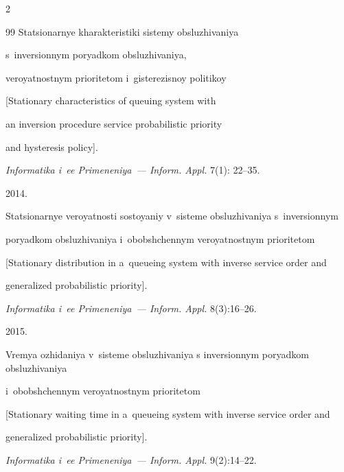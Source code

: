 \begin{multicols}{2}
{{\begin{thebibliography}{99}
Sta\-tsi\-o\-nar\-nye kharakteristiki sistemy obsluzhivaniya


s~in\-ver\-si\-on\-nym poryadkom obsluzhivaniya,


veroyatnostnym pri\-ori\-te\-tom i~gisterezisnoy politikoy


[Stationary characteristics of queuing system with


an inversion procedure service probabilistic priority


and hysteresis policy].


\textit{Informatika i~ee Primeneniya~--- Inform. Appl.} 7(1): 22--35.



















 2014.


Sta\-tsi\-o\-nar\-nye veroyatnosti sostoyaniy v~sisteme obsluzhivaniya s~inversionnym 


poryadkom ob\-slu\-zhi\-va\-niya i~obob\-shchen\-nym veroyatnostnym prioritetom


[Stationary distribution in a~queueing system with inverse service order and


generalized probabilistic priority].


\textit{Informatika i~ee Primeneniya~--- Inform. Appl.} 8(3):16--26.







 2015.


Vremya ozhidaniya v~sisteme obsluzhivaniya s inversionnym poryadkom obsluzhivaniya 


i~obobshchennym veroyatnostnym prioritetom


[Stationary waiting time in a~queueing system with inverse service order and 


generalized probabilistic priority].


\textit{Informatika i~ee Primeneniya~--- Inform. Appl.} 9(2):14--22.






\end{thebibliography}}}
\end{multicols}
